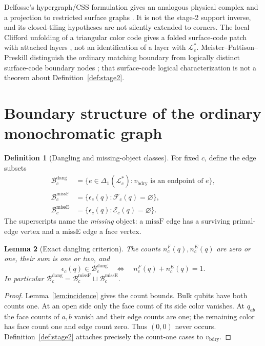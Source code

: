 \documentclass[11pt]{article}
\theoremstyle{definition}
\newtheorem{definition}{Definition}[section]
\theoremstyle{plain}
\newtheorem{lemma}[definition]{Lemma}
\theoremstyle{remark}
\newcommand{\LL}{\mathcal L}
\newcommand{\bd}{v_{\mathrm{bdry}}}
\newcommand{\eps}{\epsilon}
\newcommand{\dang}{\mathrm{dang}}
\newcommand{\missF}{\mathrm{missF}}
\newcommand{\missE}{\mathrm{missE}}
\begin{document}
Delfosse's hypergraph/CSS formulation gives an analogous physical complex
and a projection to restricted surface graphs
\cite[Secs.~4.1--4.3, Definition~5.5, Theorem~5.6]{Delfosse}.
It is not the stage-2 support inverse, and its closed-tiling hypotheses
are not silently extended to corners.
The local Clifford unfolding of a triangular color code gives a folded
surface-code patch with attached layers
\cite[Sec.~III.B, Eq.~(44), Theorem~3]{Kubica}, not an identification
of a layer with $\LL_c^*$.
Meister--Pattison--Preskill distinguish the ordinary matching boundary
from logically distinct surface-code boundary nodes
\cite[Sec.~II.B.1, pp.~2--3]{Meister}; that surface-code logical
characterization is not a theorem about Definition~\ref{def:stage2}.

\section{Boundary structure of the ordinary monochromatic graph}
\label{sec:boundary}
\begin{definition}[Dangling and missing-object classes]\label{def:classes}
For fixed $c$, define the edge subsets
\begin{align*}
 \mathcal B_c^{\dang}
  &=\{e\in\Delta_1(\LL_c^*):\bd\text{ is an endpoint of }e\},\\
 \mathcal B_c^{\missF}
  &=\{\eps_c(q):\mathcal F_c(q)=\varnothing\},\\
 \mathcal B_c^{\missE}
  &=\{\eps_c(q):\mathcal E_c(q)=\varnothing\}.
\end{align*}
The superscripts name the \emph{missing} object: a $\missF$ edge
has a surviving primal-edge vertex and a $\missE$ edge a face vertex.
\end{definition}

\begin{lemma}[Exact dangling criterion]\label{lem:dangling}
The counts $n_c^F(q),n_c^E(q)$ are zero or one, their sum is one or two,
and
\[
 \eps_c(q)\in\mathcal B_c^{\dang}
 \quad\Longleftrightarrow\quad n_c^F(q)+n_c^E(q)=1.
\]
In particular
$\mathcal B_c^{\dang}=\mathcal B_c^{\missF}\sqcup\mathcal B_c^{\missE}$.
\end{lemma}
\begin{proof}
Lemma~\ref{lem:incidence} gives the count bounds. Bulk qubits have both
counts one. At an open side only the face count of its side color
vanishes. At $q_{ab}$ the face counts of $a,b$ vanish and their edge
counts are one; the remaining color has face count one and edge
count zero. Thus $(0,0)$ never occurs. Definition~\ref{def:stage2}
attaches precisely the count-one cases to $\bd$.
\end{proof}
\end{document}

